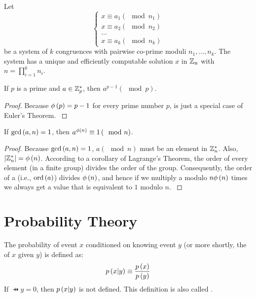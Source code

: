 \begin{theo}
Let
\begin{equation}
\left\{\begin{array}{l}
x\equiv a_1\left(\mod n_1\right)\\
x\equiv a_2\left(\mod n_2\right)\\
\ldots\\
x\equiv a_k\left(\mod n_k\right)
\end{array}\right.
\end{equation}
be a system of $k$ congruences with pairwise co-prime moduli $n_1,\ldots,n_k$. The system has a unique and efficiently computable solution $x$ in $\mathbb{Z}_n$ with $n=\prod_{i=1}^kn_i$.
\cite{Oppliger:2011:CC:2049860}
\end{theo}

\begin{theo}
If $p$ is a prime and $a\in\mathbb{Z}^*_p$, then $a^{p-1}\left(\mod p\right)$.
\begin{proof}
Because $\phi\left(p\right)=p-1$ for every prime number $p$,  is just a special case of Euler's Theorem.
\cite{Oppliger:2011:CC:2049860}
\end{proof}
\end{theo}

\begin{theo}
If $\mbox{gcd}\left(a,n\right)=1$, then $a^{\phi\left(n\right)}\equiv 1\left(\mod n\right)$.
\begin{proof}
Because $\mbox{gcd}\left(a,n\right)=1$, $a \left(\mod n\right)$ must be an element in $\mathbb{Z}^*_n$. Also, $\left|\mathbb{Z}^*_n\right|=\phi\left(n\right)$. According to a corollary of Lagrange's Theorem, the order of every element (in a finite group) divides the order of the group. Consequently, the order of a (i.e., $\mbox{ord}\left(a\right)$) divides $\phi\left(n\right)$, and hence if we multiply a modulo $n\phi\left(n\right)$ times we always get a value that is equivalent to $1$ modulo $n$.
\cite{Oppliger:2011:CC:2049860}
\end{proof}
\end{theo}

\section{Probability Theory}

\begin{defi}
The probability of event $x$ conditioned on knowing event $y$ (or more shortly, the  of $x$ given $y$) is defined as:
\begin{equation}
p\left(x|y\right)\equiv\displaystyle\frac{p\left(x\right)}{p\left(y\right)}
\end{equation}
If $\pfun{y}=0$, then $p\left(x|y\right)$ is not defined. This definition is also called .
\cite{Barber2011}
\end{defi}

